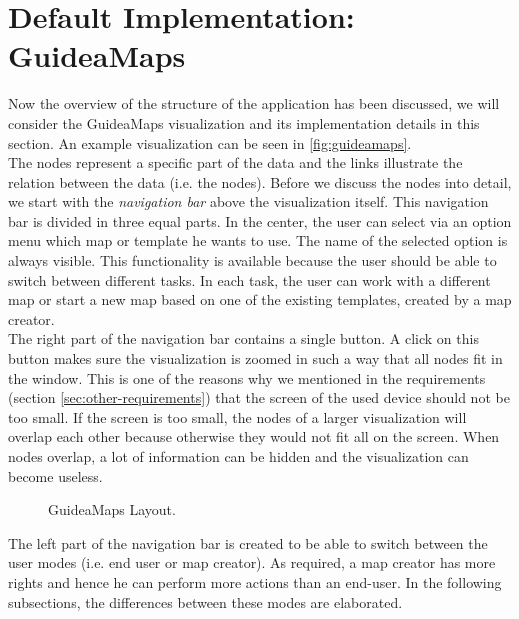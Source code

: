 \section{Default Implementation: GuideaMaps}\label{sec:default-implementation}
Now the overview of the structure of the application has been discussed, we will consider the GuideaMaps visualization and its implementation details in this section. An example visualization can be seen in \autoref{fig:guideamaps}.\\

The nodes represent a specific part of the data and the links illustrate the relation between the data (i.e. the nodes). Before we discuss the nodes into detail, we start with the \textit{navigation bar} above the visualization itself. This navigation bar is divided in three equal parts. In the center, the user can select via an option menu which map or template he wants to use. The name of the selected option is always visible. This functionality is available because the user should be able to switch between different tasks. In each task, the user can work with a different map or start a new map based on one of the existing templates, created by a map creator.\\

The right part of the navigation bar contains a single button. A click on this button makes sure the visualization is zoomed in such a way that all nodes fit in the window. This is one of the reasons why we mentioned in the requirements (section \ref{sec:other-requirements}) that the screen of the used device should not be too small. If the screen is too small, the nodes of a larger visualization will overlap each other because otherwise they would not fit all on the screen. When nodes overlap, a lot of information can be hidden and the visualization can become useless.

\begin{figure}[h]
	\centering
	\caption{GuideaMaps Layout.}
	\label{fig:guideamaps}
\end{figure}

The left part of the navigation bar is created to be able to switch between the user modes (i.e. end user or map creator). As required, a map creator has more rights and hence he can perform more actions than an end-user. In the following subsections, the differences between these modes are elaborated.





